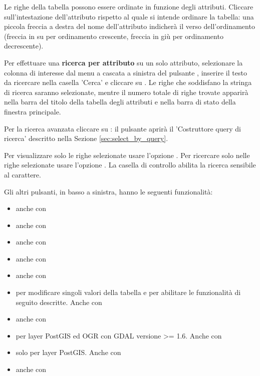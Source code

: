 Le righe della tabella possono essere ordinate in funzione degli attributi. Cliccare 
sull'intestazione dell'attributo rispetto al quale si intende ordinare la tabella: una piccola
freccia a destra del nome dell'attributo indicherà il verso dell'ordinamento (freccia in su
per ordinamento crescente, freccia in giù per ordinamento decrescente).

Per effettuare una \textbf{ricerca per attributo} su un solo attributo, selezionare la colonna
di interesse dal menu a cascata a sinistra del pulsante , inserire il testo da
ricercare nella casella 'Cerca' e cliccare su . 
Le righe che soddisfano la stringa di ricerca saranno selezionate, mentre il numero totale di
righe trovate apparirà nella barra del titolo della tabella degli attributi e nella barra di stato
della finestra principale.

Per la ricerca avanzata cliccare su : il pulsante aprirà il 
'Costruttore query di ricerca' descritto nella Sezione \ref{sec:select_by_query}.

Per visualizzare solo le righe selezionate usare l'opzione . 
Per ricercare solo nelle righe selezionate usare l'opzione . 
La casella di controllo  abilita la ricerca sensibile al carattere.

Gli altri pulsanti, in basso a sinistra, hanno le seguenti funzionalità:

\begin{itemize}[label=--]
\item {} anche con 
\item {} anche con 
\item {} anche con 
\item {} anche con 
\item {} anche con 
\item {} per modificare singoli valori della tabella e per 
abilitare le funzionalità di seguito descritte. Anche con 
\item {} anche con 
\item {} per layer PostGIS ed OGR con GDAL versione >= 1.6. 
Anche con 
\item {} solo per layer PostGIS. Anche con 
\item {} anche con 
\end{itemize}

